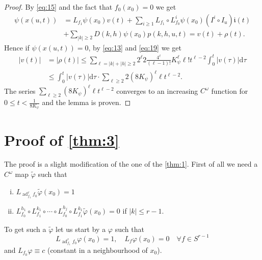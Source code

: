 \documentclass{article}
\newcommand{\ad}{\operatorname{ad}}
\newcommand{\dd}{\mathrm{d}}
\begin{document}
\begin{proof}
	By \eqref{eq:15} and the fact that $f_0\left(x_0\right)=0$ we get
	\begin{equation*}
		\begin{split}
			\psi(x(u, t)) 
			& = L_{f_1} \psi\left(x_0\right) v(t)+\sum_{i \geq 1} L_{f_1} \circ L_{f_0}^i \psi\left(x_0\right)(I^i \circ I_u) \mathfrak{i} (t) \\
			& + \sum_{|k| \geq 2} D(k, h) \psi\left(x_0\right) p(k, h, u, t)=v(t)+\rho(t) .
		\end{split}
	\end{equation*}
	Hence if $\psi(x(u, t))=0$, by \eqref{eq:13} and \eqref{eq:19} we get
	\begin{equation*}
		\begin{aligned}
			|v(t)| & =|\rho(t)| \leq \sum_{\ell=|k|+|h| \geq 2} 2^{\ell} 2 	\frac{4^{\ell}}{(\ell-1) !} K_\psi^{\ell} \ell ! t^{\ell-2} \int_0^t|v(\tau)| \dd \tau \\
			& \leq \int_0^t|v(\tau)| \dd \tau \cdot \sum_{\ell \geq 2} 2(8 K_\psi)^{\ell} \ell t^{\ell-2} .
		\end{aligned}
	\end{equation*}
	The series $\sum_{\ell \geq 2}\left(8 K_\psi\right)^{\ell} \ell t^{\ell-2}$ converges to an increasing $C^\omega$ function for $0 \leq t <\frac{1}{8K_\psi}$ and the lemma is proven.
\end{proof}

\section{Proof of \texorpdfstring{\cref{thm:3}}{Theorem 3}}

The proof is a slight modification of the one of the \cref{thm:1}.
First of all we need a $C^\omega$ map $\tilde{\varphi}$ such that
\begin{enumerate}[i)]
	\item $L_{\operatorname{ad}_{f_1}^r f_0} \tilde{\varphi}\left(x_0\right)=1$
	\item \label{ii} $L_{f_0}^{h_1} \circ L_{f_1}^{k_1} \circ \cdots \circ L_{f_0}^{h_j} \circ L_{f_1}^{k_1} \tilde{\varphi} \left(x_0\right)=0$ if $|k| \leq r-1$.
\end{enumerate}
To get such a $\tilde{\varphi}$ let us start by a $\varphi$ such that
\begin{equation*}
	L_{\ad_{f_1}^r f_0} \varphi\left(x_0\right)=1, \quad L_f \varphi\left(x_0\right)=0 \quad \forall f \in S^{r-1}
\end{equation*}
and $L_{f_0} \varphi \equiv c$ (constant in a neighbourhood of $x_0$).
\end{document}
